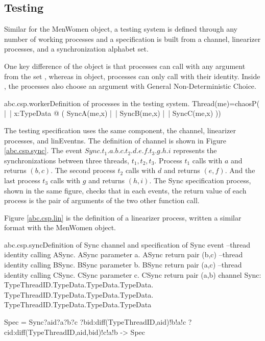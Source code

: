 \documentclass[a4paper, 12pt]{article}
\begin{document}
\subsection{Testing}
Similar for the MenWomen object, a testing system is defined through any number of working processes and a specification is built from a  channel, linearizer processes, and a synchronization alphabet set. 

One key difference of the  object is that processes can call with any argument from the set , whereas in  object, processes can only call with their identity. Inside , the processes also choose an argument with General Non-Deterministic Choice. 

\begin{cspinline}{abc.csp.worker}{Definition of processes in the testing system.}
Thread(me)=chaosP( |~| x:TypeData @ (
    SyncA(me,x) 
  |~| SyncB(me,x) 
  |~| SyncC(me,x)
))
\end{cspinline}

The testing specification uses the same component, the  channel, linearizer processes, and linEventns. The definition of  channel is shown in Figure \ref{abc.csp.sync}. The event $Sync.t_1.a.b.c.t_2.d.e.f.t_3.g.h.i$ represents the synchronizations between three threads, $t_1,t_2,t_3$. Process $t_1$ calls  with $a$ and returns $(b,c)$. The second process $t_2$ calls  with $d$ and returns $(e,f)$. And the last process $t_3$ calls  with $g$ and returns $(h,i)$. The Sync specification process, shown in the same figure, checks that in each  events, the return value of each process is the pair of arguments of the two other function call. 

Figure \ref{abc.csp.lin} is the definition of a linearizer process, written a similar format with the MenWomen object.

\begin{cspfloat}{abc.csp.sync}{Definition of Sync channel and specification of Sync event}
--thread identity calling ASync. ASync parameter a. ASync return pair (b,c)
--thread identity calling BSync. BSync parameter b. BSync return pair (a,c)
--thread identity calling CSync. CSync parameter c. CSync return pair (a,b)
channel Sync: TypeThreadID.TypeData.TypeData.TypeData.
              TypeThreadID.TypeData.TypeData.TypeData.
              TypeThreadID.TypeData.TypeData.TypeData

Spec = Sync?aid?a?b?c
           ?bid:diff(TypeThreadID,{aid})!b!a!c
           ?cid:diff(TypeThreadID,{aid,bid})!c!a!b 
    -> Spec
\end{cspfloat}
\end{document}
